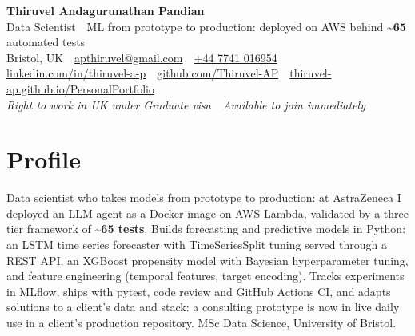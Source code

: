 \documentclass[a4paper,11pt]{article}
\newcommand{\num}[1]{\textbf{#1}}
\begin{document}
\begin{center}
  {\fontsize{22}{26}\selectfont\bfseries\color{navy} Thiruvel Andagurunathan Pandian}\\[4pt]
  {\fontsize{12}{14}\selectfont\color{navy} Data Scientist \,\textperiodcentered\, ML from prototype to production: deployed on AWS behind \num{\textasciitilde65} automated tests}\\[4pt]
  {\small
  Bristol, UK \,\textperiodcentered\,
  \href{mailto:apthiruvel@gmail.com}{apthiruvel@gmail.com} \,\textperiodcentered\,
  \href{tel:+447741016954}{+44 7741 016954} \,\textperiodcentered\,
  \href{https://www.linkedin.com/in/thiruvel-a-p/}{linkedin.com/in/thiruvel-a-p} \,\textperiodcentered\,
  \href{https://github.com/Thiruvel-AP}{github.com/Thiruvel-AP} \,\textperiodcentered\,
  \href{https://thiruvel-ap.github.io/PersonalPortfolio/}{thiruvel-ap.github.io/PersonalPortfolio}}\\[3pt]
  {\small\itshape\color{muted} Right to work in UK under Graduate visa \,\textperiodcentered\, Available to join immediately}
\end{center}

\section{Profile}
Data scientist who takes models from prototype to production: at AstraZeneca I deployed an LLM agent as a Docker image on AWS Lambda, validated by a three tier framework of \num{\textasciitilde65 tests}. Builds forecasting and predictive models in Python: an LSTM time series forecaster with TimeSeriesSplit tuning served through a REST API, an XGBoost propensity model with Bayesian hyperparameter tuning, and feature engineering (temporal features, target encoding). Tracks experiments in MLflow, ships with pytest, code review and GitHub Actions CI, and adapts solutions to a client's data and stack: a consulting prototype is now in live daily use in a client's production repository. MSc Data Science, University of Bristol.

\end{document}

